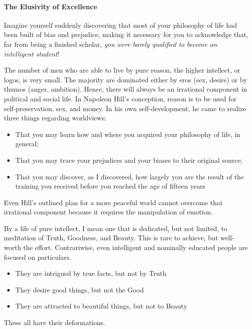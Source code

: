 \paragraph{The Elusivity of Excellence}
\begin{quotex}
Imagine yourself suddenly discovering that most of your philosophy of life had been built of bias and prejudice, making it necessary for you to acknowledge that, far from being a finished scholar, \emph{you were barely qualified to become an intelligent student}! 

\end{quotex}
The number of men who are able to live by pure reason, the higher intellect, or logos, is very small. The majority are dominated either by eros (sex, desire) or by thumos (anger, ambition). Hence, there will always be an irrational component in political and social life. In Napoleon Hill's conception, reason is to be used for self-preservation, sex, and money. In his own self-development, he came to realize three things regarding worldviews:

\begin{itemize}
\item That you may learn how and where you acquired your philosophy of life, in general; 
\item That you may trace your prejudices and your biases to their original source; 
\item That you may discover, as I discovered, how largely you are the result of the training you received before you reached the age of fifteen years 
\end{itemize}
Even Hill's outlined plan for a more peaceful world cannot overcome that irrational component because it requires the manipulation of emotion.

By a life of pure intellect, I mean one that is dedicated, but not limited, to meditation of Truth, Goodness, and Beauty. This is rare to achieve, but well-worth the effort. Contrariwise, even intelligent and nominally educated people are focused on particulars.

\begin{itemize}
\item They are intrigued by true facts, but not by Truth 
\item They desire good things, but not the Good 
\item They are attracted to beautiful things, but not to Beauty 
\end{itemize}
These all have their deformations.


